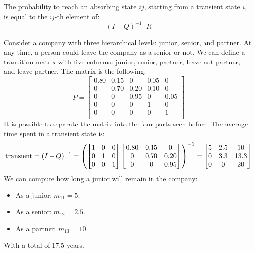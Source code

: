 The probability to reach an absorbing state $ij$, starting from a transient state $i$, is equal to the $ij$-th element of: 
\[(I-Q)^{-1} \cdot R\]
\begin{example}
    Consider a company with three hierarchical levels: junior, senior, and partner. 
    At any time, a person could leave the company as a senior or not. 
    We can define a transition matrix with five columns: junior, senior, partner, leave not partner, and leave partner. 
    The matrix is the following:
    \[P= 
    \begin{bmatrix}
        0.80    & 0.15  & 0     & 0.05  & 0 \\
        0       & 0.70  & 0.20  & 0.10  & 0 \\
        0       & 0     & 0.95  & 0     & 0.05 \\
        0       & 0     & 0     & 1     & 0 \\
        0       & 0     & 0     & 0     & 1 \\
    \end{bmatrix}\]
    It is possible to separate the matrix into the four parts seen before.
    The average time spent in a transient state is:
    \[\textnormal{transient}=(I-Q)^{-1}=\left(  
        \begin{bmatrix}
            1       & 0     & 0  \\
            0       & 1     & 0  \\
            0       & 0     & 1  \\
        \end{bmatrix}
        \begin{bmatrix}
            0.80    & 0.15  & 0     \\
            0       & 0.70  & 0.20  \\
            0       & 0     & 0.95  \\
        \end{bmatrix}\right)^{-1}=        
    \begin{bmatrix}
        5       & 2.5   & 10    \\
        0       & 3.3   & 13.3  \\
        0       & 0     & 20    \\
    \end{bmatrix}\]
    We can compute how long a junior will remain in the company:
    \begin{itemize}
        \item As a junior: $m_{11}=5$.
        \item As a senior: $m_{12}=2.5$.
        \item As a partner: $m_{13}=10$.
    \end{itemize}
    With a total of 17.5 years.


\end{example}
